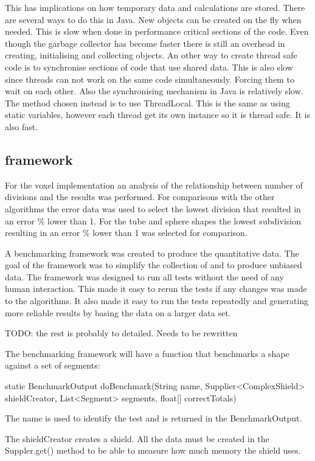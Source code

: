 \documentclass[11pt,twoside,a4paper]{report}
\begin{document}
This has implications on how temporary data and calculations are stored. There are several ways to do this in Java. New objects can be created on the fly when needed. This is slow when done in performance critical sections of the code. Even though the garbage collector has become faster there is still an overhead in creating, initialising and collecting objects. An other way to create thread safe code is to synchronise sections of code that use shared data. This is also slow since threads can not work on the same code simultaneously. Forcing them to wait on each other. Also the synchronising mechanism in Java is relatively slow. The method chosen instead is to use ThreadLocal. This is the same as using static variables, however each thread get its own instance so it is thread safe. It is also fast.

\subsection{framework}
For the voxel implementation an analysis of the relationship between number of divisions and the results was performed. For comparisons with the other algorithms the error data was used to select the lowest division that resulted in an error \% lower than 1. For the tube and sphere shapes the lowest subdivision resulting in an error \% lower than 1 was selected for comparison.

A benchmarking framework was created to produce the quantitative data. The goal of the framework was to simplify the collection of and to produce unbiased data. The framework was designed to run all tests without the need of any human interaction. This made it easy to rerun the tests if any changes was made to the algorithms. It also made it easy to run the tests repeatedly and generating more reliable results by basing the data on a larger data set.

TODO: the rest is probably to detailed. Needs to be rewritten

The benchmarking framework will have a function that benchmarks a shape against a set of segments:

static BenchmarkOutput doBenchmark(String name, Supplier<ComplexShield> shieldCreator, List<Segment> segments, float[] correctTotals)

The name is used to identify the test and is returned in the BenchmarkOutput. 

The shieldCreator creates a shield. All the data must be created in the Suppler.get() method to be able to measure how much memory the shield uses.
\end{document}
